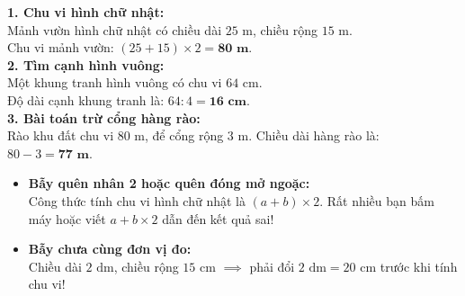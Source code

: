 \documentclass[11pt,a4paper]{article}
\begin{document}
\vspace{-2.5mm}
\noindent
\begin{minipage}[t]{0.49\textwidth}\vspace{0pt}
\begin{tcolorbox}[
  enhanced,
  colback=green!4!white,
  colframe=green!60!black,
  arc=2mm, boxrule=0.8pt,
  left=2mm, right=2mm, top=1.8mm, bottom=1.8mm,
  title={\footnotesize\bfseries\color{white}\faCheckCircle\ Ví dụ thực hành chuẩn mực}
]
{\footnotesize
\textbf{1. Chu vi hình chữ nhật:}\\
Mảnh vườn hình chữ nhật có chiều dài $25\text{ m}$, chiều rộng $15\text{ m}$.\\
Chu vi mảnh vườn: $(25 + 15) \times 2 = \mathbf{80\text{ m}}$.\\
\textbf{2. Tìm cạnh hình vuông:}\\
Một khung tranh hình vuông có chu vi $64\text{ cm}$.\\
Độ dài cạnh khung tranh là: $64 : 4 = \mathbf{16\text{ cm}}$.\\
\textbf{3. Bài toán trừ cổng hàng rào:}\\
Rào khu đất chu vi $80\text{ m}$, để cổng rộng $3\text{ m}$. Chiều dài hàng rào là: $80 - 3 = \mathbf{77\text{ m}}$.
}
\end{tcolorbox}
\end{minipage}
\hfill
\begin{minipage}[t]{0.49\textwidth}\vspace{0pt}
\begin{tcolorbox}[
  enhanced,
  colback=red!4!white,
  colframe=red!70!black,
  arc=2mm, boxrule=0.8pt,
  left=2mm, right=2mm, top=1.8mm, bottom=1.8mm,
  title={\footnotesize\bfseries\color{white}\faExclamationTriangle\ Mẹo tránh bẫy trắc nghiệm}
]
{\footnotesize
\begin{itemize}\setlength{\itemsep}{1.5pt}\setlength{\leftskip}{-2.5mm}
  \item \textbf{Bẫy quên nhân 2 hoặc quên đóng mở ngoặc:}\\
  Công thức tính chu vi hình chữ nhật là $(a + b) \times 2$. Rất nhiều bạn bấm máy hoặc viết $a + b \times 2$ dẫn đến kết quả sai!
  \item \textbf{Bẫy chưa cùng đơn vị đo:}\\
  Chiều dài $2\text{ dm}$, chiều rộng $15\text{ cm}$ $\implies$ phải đổi $2\text{ dm} = 20\text{ cm}$ trước khi tính chu vi!
\end{itemize}
}
\end{tcolorbox}
\end{minipage}
\end{document}
